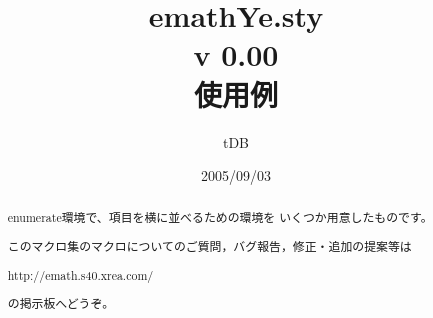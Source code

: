 \documentclass[a4j]{jarticle}
\title{\textsf{emathYe.sty} \\{\normalsize v 0.00}\\
使用例}
\author{tDB}
\date{2005/09/03}
\begin{document}
\maketitle\thispagestyle{empty}
\begin{abstract}%
\zw%
\textsf{enumerate}環境で、項目を横に並べるための環境を
いくつか用意したものです。

このマクロ集のマクロについてのご質問，バグ報告，修正・追加の提案等は
\begin{center}
http://emath.s40.xrea.com/
\end{center}
の掲示板へどうぞ。
\end{abstract}

\tableofcontents

\pagebreak
{}
\pagebreak

\def\bunsuu{\displaystyle\frac}%

\def\labelenumii{(\arabic{enumii})}
\end{document}
